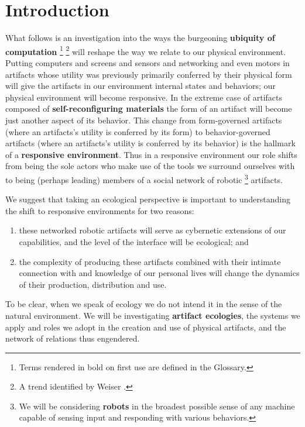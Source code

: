 \chapter{Introduction}
\label{ch:intro}
%
What follows is an investigation into the ways the burgeoning \textbf{ubiquity of computation}%
\footnote{Terms rendered in bold on first use are defined in the Glossary.}%
\footnote{A trend identified by Weiser \citeyearpar{weiser_1999}.}
will reshape the way we relate to our physical environment.
Putting computers and screens and sensors and networking and even motors in artifacts whose utility was previously primarily conferred by their physical form will give the artifacts in our environment internal states and behaviors; our physical environment will become responsive.
In the extreme case of artifacts composed of \textbf{self-reconfiguring materials} the form of an artifact will become just another aspect of its behavior.
This change from form-governed artifacts (where an artifacts's utility is conferred by its form) to behavior-governed artifacts (where an artifacts's utility is conferred by its behavior) is the hallmark of a \textbf{responsive environment}.
Thus in a responsive environment our role shifts from being the sole actors who make use of the tools we surround ourselves with to being (perhaps leading) members of a social network of robotic%
\footnote{We will be considering \textbf{robots} in the broadest possible sense of any machine capable of sensing input and responding with various behaviors.}
artifacts.

We suggest that taking an ecological perspective is important to understanding the shift to responsive environments for two reasons:
\begin{enumerate}
\item these networked robotic artifacts will serve as cybernetic extensions of our capabilities, and the level of the interface will be ecological; and
\item the complexity of producing these artifacts combined with their intimate connection with and knowledge of our personal lives will change the dynamics of their production, distribution and use.
\end{enumerate}
To be clear, when we speak of ecology we do not intend it in the sense of the natural environment.
We will be investigating \textbf{artifact ecologies}, the systems we apply and roles we adopt in the creation and use of physical artifacts, and the network of relations thus engendered.

